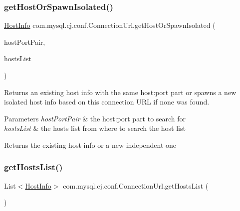 \subsubsection{\texorpdfstring{get\+Host\+Or\+Spawn\+Isolated()}{getHostOrSpawnIsolated()}\hspace{0.1cm}{\footnotesize\ttfamily [2/2]}}
{\footnotesize\ttfamily \mbox{\hyperlink{classcom_1_1mysql_1_1cj_1_1conf_1_1_host_info}{Host\+Info}} com.\+mysql.\+cj.\+conf.\+Connection\+Url.\+get\+Host\+Or\+Spawn\+Isolated (\begin{DoxyParamCaption}\item[{String}]{host\+Port\+Pair,  }\item[{List$<$ \mbox{\hyperlink{classcom_1_1mysql_1_1cj_1_1conf_1_1_host_info}{Host\+Info}} $>$}]{hosts\+List }\end{DoxyParamCaption})}

Returns an existing host info with the same host\+:port part or spawns a new isolated host info based on this connection U\+RL if none was found.


\begin{DoxyParams}{Parameters}
{\em host\+Port\+Pair} & the host\+:port part to search for \\
\hline
{\em hosts\+List} & the hosts list from where to search the host list \\
\hline
\end{DoxyParams}
\begin{DoxyReturn}{Returns}
the existing host info or a new independent one 
\end{DoxyReturn}
\mbox{\label{classcom_1_1mysql_1_1cj_1_1conf_1_1_connection_url_a31b073fdc19d1f315105a20bc6b3f5f1}} 
\subsubsection{\texorpdfstring{get\+Hosts\+List()}{getHostsList()}}
{\footnotesize\ttfamily List$<$\mbox{\hyperlink{classcom_1_1mysql_1_1cj_1_1conf_1_1_host_info}{Host\+Info}}$>$ com.\+mysql.\+cj.\+conf.\+Connection\+Url.\+get\+Hosts\+List (\begin{DoxyParamCaption}{ }\end{DoxyParamCaption})}

